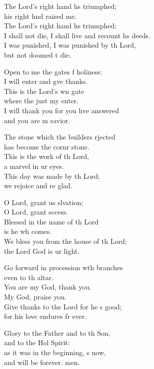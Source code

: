 \begin{psalmverse}[\versewidth]
\begin{patverse}
    The Lord’s right hand hs triumphed;\Med\\
    his right hnd raised me.\\
    The Lord’s right hand hs triumphed;\Med\\
    I shall not die, I shall live and recount h\pointup{\i}s deeds.\\
    I was punished, I was punished by th Lord,\Med\\
    but not doomed t die.

    Open to me the gates f holiness:\Med\\
    I will enter and g\pointup{\i}ve thanks.\\
    This is the Lord’s wn gate\Med\\
    where the just my enter.\\
    I will thank you for you hve answered\Med\\
    and you are m savior.

    The stone which the builders rjected\Med\\
    has become the cornr stone.\\
    This is the work of th Lord,\Med\\
    a marvel in ur eyes.\\
    This day was made by th Lord;\Med\\
    we rejoice and re glad.

    O Lord, grant us slvation;\Med\\
    O Lord, grant sccess.\\
    Blessed in the name of th Lord\Med\\
    is he wh comes.\\
    We bless you from the house of th Lord;\Med\\
    the Lord God is ur light.

    Go forward in procession w\pointup{\i}th branches\Med\\
    even to th altar.\\
    You are my God,  thank you.\Med\\
    My God,  praise you.\\
    Give thanks to the Lord for he \pointup{\i}s good;\Med\\
    for his love endures fr ever.

    Glory to the Father and to th Son,\Med\\
    and to the Hol Spirit:\\
    as it was in the beginning, \pointup{\i}s now,\Med\\
    and will be forever. men.
  \end{patverse}
\end{psalmverse}
